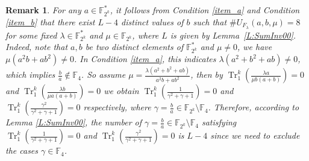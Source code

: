 \documentclass{article}
\newcommand{\F}{\mathbb{F}}
\newcommand{\0}{\textbf{0}}
\newcommand{\1}{\textbf{1}}
\newcommand{\TRACE}{\operatorname{Tr}_1^k}
\theoremstyle{plain}
\newtheorem{remark}{Remark}
\begin{document}
    \begin{remark}
        For any $a\in\F_{2^k}^*$, it follows from  Condition \ref{item_a} and Condition \ref{item_b} that there exist $L-4$ distinct values of $b$
        such that $\#U_{F_{\lambda}}(a,b,\mu)=8$ for some fixed $\lambda\in\F_{2^k}^*$ and $\mu\in\F_{2^k}$,
        where $L$ is given by Lemma~\ref{L:SumInv00}.
       Indeed, note that $a,b$ be two distinct elements of $\F_{2^k}^*$ and $\mu\ne 0$,
        we have $\mu(a^2b+ab^2)\ne 0$.
        In Condition \ref{item_a}, this indicates $\lambda(a^2+b^2+ab)\ne 0$,
        which implies $\frac{b}{a}\notin\F_4$.
        So assume $\mu=\frac{\lambda(a^2+b^2+ab)}{a^2b+ab^2}$,
        then by  $\TRACE\left(\frac{\lambda a}{\mu b(a+b)}\right)=0$
        and $\TRACE\left(\frac{\lambda b}{\mu a(a+b)}\right)=0$
        we obtain $\TRACE\left(\frac{1}{\gamma^2+\gamma+1}\right)=0$ and $\TRACE\left(\frac{\gamma^2}{\gamma^2+\gamma+1}\right)=0$ respectively,
        where $\gamma=\frac{b}{a}\in\F_{2^k}\setminus\F_{4}$.
        Therefore, according to Lemma \ref{L:SumInv00},
        the number of $\gamma=\frac{b}{a}\in\F_{2^k}\setminus\F_{4}$ satisfying
        $\TRACE\left(\frac{1}{\gamma^2+\gamma+1}\right)=0$ and $\TRACE\left(\frac{\gamma^2}{\gamma^2+\gamma+1}\right)=0$
        is $L-4$ since we need to exclude the cases $\gamma\in\F_4$.
    \end{remark}
\end{document}
